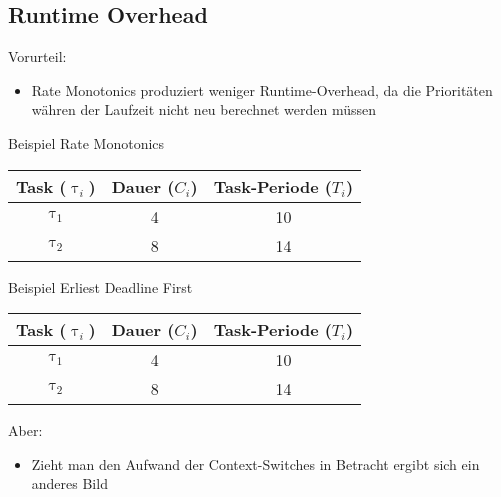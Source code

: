 \subsection{Runtime Overhead}
\begin{frame}{\subsecname}
	Vorurteil:
	\begin{itemize}
		\item Rate Monotonics produziert weniger Runtime-Overhead, da die Prioritäten währen der Laufzeit nicht neu berechnet werden müssen
	\end{itemize}
\end{frame}

\newcommand{\showRMSlideRO}[1] {\begin{frame}{Beispiel Rate Monotonics}
	\begin{center}
		\begin{tabular}{c||c|c}
			Task ($\uptau_i$) & Dauer ($C_i$) & Task-Periode ($T_i$)\\\hline\hline
			$\uptau_1$ & 4 & 10\\
			$\uptau_2$ & 8 & 14
		\end{tabular}
	\end{center}
	
\end{frame}}

%
{%
	\showRMSlideRO{\arabic{ct}}
}


\begin{frame}{Beispiel Erliest Deadline First}
	\begin{center}
		\begin{tabular}{c||c|c}
			Task ($\uptau_i$) & Dauer ($C_i$) & Task-Periode ($T_i$)\\\hline\hline
			$\uptau_1$ & 4 & 10\\
			$\uptau_2$ & 8 & 14
		\end{tabular}
	\end{center}
	
\end{frame}

\begin{frame}{\subsecname}
	Aber:\pause
	\begin{itemize}
		\item Zieht man den Aufwand der Context-Switches in Betracht ergibt sich ein anderes Bild
	\end{itemize}
\end{frame}

